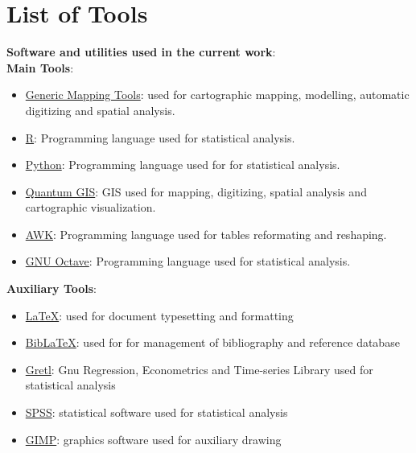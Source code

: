 \documentclass[11pt,a4paper]{report}
\begin{document}
\pagebreak
\section*{}\label{chp:fig}
\singlespace
\setcounter{lofdepth}{2}
\listoffigures

\section*{List of Tools}\label{chp:too}
\singlespace
	\textbf{Software and utilities used in the current work}:\\	
	\vspace{1ex}
	\textbf{Main Tools}:
		\begin{itemize}
			\item \href{https://github.com/GenericMappingTools/gmt}{Generic Mapping Tools}: used for cartographic mapping, modelling, automatic digitizing and spatial analysis.
			\item \href{https://www.r-project.org/about.html}{R}: Programming language used for statistical analysis.
			\item \href{https://www.python.org/}{Python}: Programming language used for for statistical analysis.
			\item \href{http://www.qgis.org/}{Quantum GIS}: GIS used for mapping, digitizing, spatial analysis and cartographic visualization.
			\item \href{https://github.com/onetrueawk/awk}{AWK}: Programming language used for tables reformating and reshaping.
			\item \href{https://www.gnu.org/software/octave/}{GNU Octave}: Programming language used for statistical analysis.
		\end{itemize}
	\vspace{1ex}
	\textbf{Auxiliary Tools}:
		\begin{itemize}
			\item \href{http://www.latex-project.org/}{\LaTeX}: used for document typesetting and formatting
			\item \href{http://www.bibtex.org/de/}{Bib\LaTeX}: used for for management of bibliography and reference database
			\item \href{http://gretl.sourceforge.net/}{Gretl}: Gnu Regression, Econometrics and Time-series Library used for statistical analysis
			\item \href{http://www.gimp.org/}{SPSS}: statistical software used for statistical analysis
			\item \href{http://www.gimp.org/}{GIMP}: graphics software used for auxiliary drawing			
		\end{itemize}
		
\end{document}
